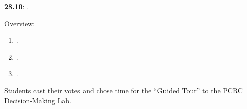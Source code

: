 \documentclass[letterpaper]{article}
\renewenvironment{itemize}{
  \begin{list}{}{
    \setlength{\leftmargin}{1.5em}
  }
}{
  \end{list}
}
\begin{document}
\begin{enumerate}

\item {\bf 28.10}: {\color{ForestGreen}{\bf Causal Inference in Social Sciences}}.

      \begin{itemize} 

        \item[$\diamond$] Overview:

        \begin{enumerate}

          \item[$\bullet$] \href{https://doi.org/10.1017/9781108991353.003}{}.



          \item[$\bullet$] \href{https://doi.org/10.1017/CBO9781107587991.003}{}.


          \item[$\bullet$] \href{https://www.jstor.org/stable/270939}{}.










        \end{enumerate}

        \item[{\color{red}$\diamond$}] {\color{red} Students cast their votes \href{https://doodle.com/meeting/participate/id/dLnyLoXa}{{}} and chose time for the ``Guided Tour'' to the PCRC Decision-Making Lab}.



\end{itemize}
\end{enumerate}
\end{document}
